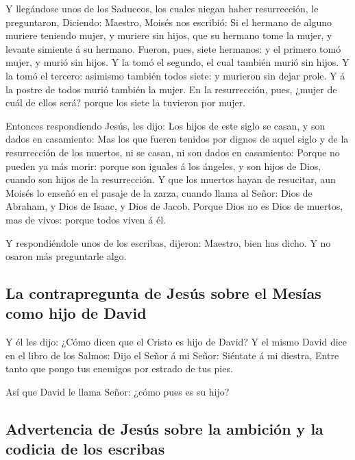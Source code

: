  Y llegándose unos de los Saduceos, los cuales niegan
haber resurrección, le preguntaron,  Diciendo: Maestro,
Moisés nos escribió: Si el hermano de alguno muriere teniendo mujer, y
muriere sin hijos, que su hermano tome la mujer, y levante simiente á su
hermano.  Fueron, pues, siete hermanos: y el primero tomó
mujer, y murió sin hijos.  Y la tomó el segundo, el cual
también murió sin hijos.  Y la tomó el tercero: asimismo
también todos siete: y murieron sin dejar prole.  Y á la
postre de todos murió también la mujer.  En la
resurrección, pues, ¿mujer de cuál de ellos será? porque los siete la
tuvieron por mujer.

 Entonces respondiendo Jesús, les dijo: Los hijos de este
siglo se casan, y son dados en casamiento:  Mas los que
fueren tenidos por dignos de aquel siglo y de la resurrección de los
muertos, ni se casan, ni son dados en casamiento:  Porque
no pueden ya más morir: porque son iguales á los ángeles, y son hijos de
Dios, cuando son hijos de la resurrección.  Y que los
muertos hayan de resucitar, aun Moisés lo enseñó en el pasaje de la
zarza, cuando llama al Señor: Dios de Abraham, y Dios de Isaac, y Dios
de Jacob.  Porque Dios no es Dios de muertos, mas de
vivos: porque todos viven á él.

 Y respondiéndole unos de los escribas, dijeron: Maestro,
bien has dicho.  Y no osaron más preguntarle algo.

\hypertarget{la-contrapregunta-de-jesuxfas-sobre-el-mesuxedas-como-hijo-de-david}{%
\subsection{La contrapregunta de Jesús sobre el Mesías como hijo de
David}\label{la-contrapregunta-de-jesuxfas-sobre-el-mesuxedas-como-hijo-de-david}}

 Y él les dijo: ¿Cómo dicen que el Cristo es hijo de
David?  Y el mismo David dice en el libro de los Salmos:
Dijo el Señor á mi Señor: Siéntate á mi diestra,  Entre
tanto que pongo tus enemigos por estrado de tus pies.

 Así que David le llama Señor: ¿cómo pues es su hijo?

\hypertarget{advertencia-de-jesuxfas-sobre-la-ambiciuxf3n-y-la-codicia-de-los-escribas}{%
\subsection{Advertencia de Jesús sobre la ambición y la codicia de los
escribas}\label{advertencia-de-jesuxfas-sobre-la-ambiciuxf3n-y-la-codicia-de-los-escribas}}

